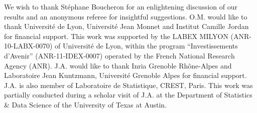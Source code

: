 \documentclass[15pt]{article}
\theoremstyle{plain}
\begin{document}
We wish to thank St\'ephane Boucheron  for an enlightening discussion of our results and an anonymous referee for insightful suggestions.  
O.M. would like to thank Universit\'e de Lyon, Universit\'e Jean Monnet and Institut Camille Jordan for financial support. This work was supported by the LABEX MILYON (ANR-10-LABX-0070) of Universit\'e de Lyon, within the program ``Investissements d'Avenir'' (ANR-11-IDEX-0007) operated by the French National Research Agency (ANR).
J.A. would like to thank Inria Grenoble Rh\^one-Alpes and 
Laboratoire Jean Kuntzmann, Universit\'e Grenoble Alpes for financial support.  J.A. is also member of Laboratoire de Statistique, CREST, Paris. This work was partially conducted during a scholar visit of J.A. at the Department of Statistics \& Data Science of the University of Texas at Austin.



%

%

\end{document}
